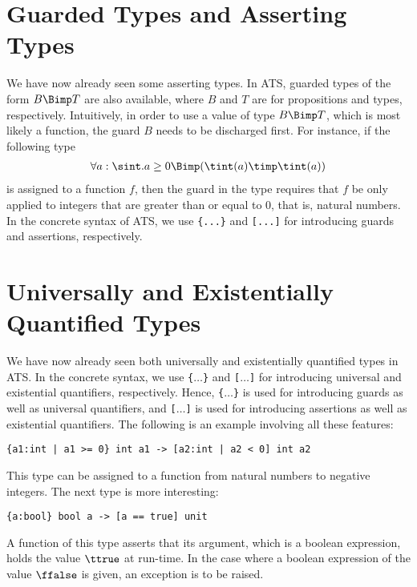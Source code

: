 \section{Guarded Types and Asserting Types}
We have now already seen some asserting types. In ATS, guarded types of the
form $B\Bimp T$ are also available, where $B$ and $T$ are for propositions
and types, respectively.  Intuitively, in order to use a value of type
$B\Bimp T$, which is most likely a function, the guard $B$ needs to be
discharged first.  For instance, if the following type
\[\begin{array}{c}
\forall a:\sint.a\geq 0\Bimp (\tint (a) \timp \tint (a)) \\
\end{array}\]
is assigned to a function $f$, then the guard in the type requires that $f$
be only applied to integers that are greater than or equal to 0, that is,
natural numbers. In the concrete syntax of ATS, we use
\verb`{...}` and \verb`[...]` for introducing guards and assertions,
respectively.

\section{Universally and Existentially Quantified Types}
We have now already seen both universally and existentially quantified
types in ATS. In the concrete syntax, we use
\verb`{`$\ldots$\verb`}` and \verb`[`$\ldots$\verb`]` for introducing universal and
existential quantifiers, respectively. Hence,
\verb`{`$\ldots$\verb`}`
is used for introducing guards as well as universal quantifiers, and
\verb`[`$\ldots$\verb`]` is used for introducing assertions as well as
existential quantifiers. The following is an example involving all these
features:
\begin{verbatim}
{a1:int | a1 >= 0} int a1 -> [a2:int | a2 < 0] int a2
\end{verbatim}
This type can be assigned to a function from natural numbers to negative
integers. The next type is more interesting:
\begin{verbatim}
{a:bool} bool a -> [a == true] unit
\end{verbatim}
A function of this type asserts that its argument, which is a boolean
expression, holds the value $\ttrue$ at run-time. In the case where a
boolean expression of the value $\ffalse$ is given, an exception is to be
raised.

